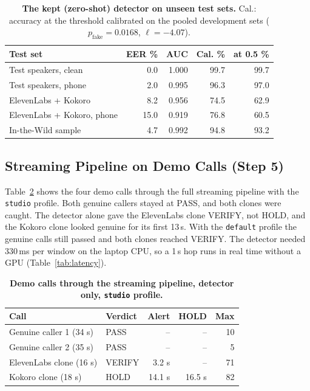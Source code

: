 \documentclass[10pt,a4paper,twocolumn]{article}
\newcommand{\llr}{\ell}
\begin{document}
\begin{table}[t]
\centering\footnotesize
\caption{\textbf{The kept (zero-shot) detector on unseen test sets.} Cal.: accuracy at the threshold calibrated on the pooled development sets ($p_{\text{fake}}=0.0168$, $\llr=-4.07$).}
\label{tab:step4test}
\setlength{\tabcolsep}{4pt}
\begin{tabular}{@{}p{}rrrr@{}}
\toprule
\textbf{Test set} & \textbf{EER \%} & \textbf{AUC} & \textbf{Cal. \%} & \textbf{at 0.5 \%}\\
\midrule
Test speakers, clean & 0.0 & 1.000 & 99.7 & 99.7\\
Test speakers, phone & 2.0 & 0.995 & 96.3 & 97.0\\
ElevenLabs + Kokoro & 8.2 & 0.956 & 74.5 & 62.9\\
ElevenLabs + Kokoro, phone & 15.0 & 0.919 & 76.8 & 60.5\\
In-the-Wild sample & 4.7 & 0.992 & 94.8 & 93.2\\
\bottomrule
\end{tabular}
\end{table}

\subsection{Streaming Pipeline on Demo Calls (Step 5)}
Table~\ref{tab:demo} shows the four demo calls through the full streaming pipeline with the \texttt{studio} profile. Both genuine callers stayed at PASS, and both clones were caught. The detector alone gave the ElevenLabs clone VERIFY, not HOLD, and the Kokoro clone looked genuine for its first 13\,s. With the \texttt{default} profile the genuine calls still passed and both clones reached VERIFY. The detector needed 330\,ms per window on the laptop CPU, so a 1\,s hop runs in real time without a GPU (Table~\ref{tab:latency}).

\begin{table}[t]
\centering\footnotesize
\caption{\textbf{Demo calls through the streaming pipeline, detector only, \texttt{studio} profile.}}
\label{tab:demo}
\begin{tabular}{@{}p{}lrrr@{}}
\toprule
\textbf{Call} & \textbf{Verdict} & \textbf{Alert} & \textbf{HOLD} & \textbf{Max}\\
\midrule
Genuine caller 1 (34 s) & PASS & -- & -- & 10\\
Genuine caller 2 (35 s) & PASS & -- & -- & 5\\
ElevenLabs clone (16 s) & VERIFY & 3.2 s & -- & 71\\
Kokoro clone (18 s) & HOLD & 14.1 s & 16.5 s & 82\\
\bottomrule
\end{tabular}
\end{table}
\end{document}
